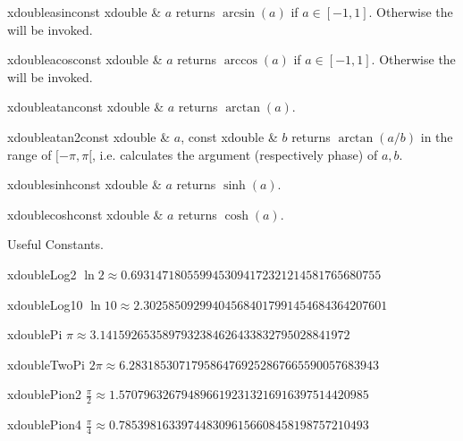 \begin{fcode}{xdouble}{asin}{const xdouble & $a$}
  returns $\arcsin(a)$ if $a \in [ -1, 1 ]$.  Otherwise the \LEH will be invoked.
\end{fcode}

\begin{fcode}{xdouble}{acos}{const xdouble & $a$}
  returns $\arccos(a)$ if $a \in [ -1, 1 ]$.  Otherwise the \LEH will be invoked.
\end{fcode}

\begin{fcode}{xdouble}{atan}{const xdouble & $a$}
  returns $\arctan(a)$.
\end{fcode}

\begin{fcode}{xdouble}{atan2}{const xdouble & $a$, const xdouble & $b$}
  returns $\arctan(a / b)$ in the range of $[ -\pi, \pi [$, i.e. 
  calculates the argument (respectively phase) of $a, b$.
\end{fcode}




\begin{fcode}{xdouble}{sinh}{const xdouble & $a$}
  returns $\sinh(a)$.
\end{fcode}


\begin{fcode}{xdouble}{cosh}{const xdouble & $a$}
  returns $\cosh(a)$.
\end{fcode}




Useful Constants.

\begin{fcode}{xdouble}{Log2}{}
    $\ln 2 \approx 0.6931471805599453094172321214581765680755$
\end{fcode}
\begin{fcode}{xdouble}{Log10}{}
  $\ln 10 \approx 2.302585092994045684017991454684364207601$ 
\end{fcode}
\begin{fcode}{xdouble}{Pi}{}
  $\pi \approx 3.1415926535897932384626433832795028841972$ 
\end{fcode}
\begin{fcode}{xdouble}{TwoPi}{}
  $2 \pi \approx 6.2831853071795864769252867665590057683943$ 
\end{fcode}
\begin{fcode}{xdouble}{Pion2}{}
  $\frac{\pi}{2} \approx 1.5707963267948966192313216916397514420985$ 
\end{fcode}
\begin{fcode}{xdouble}{Pion4}{}
  $\frac{\pi}{4} \approx 0.7853981633974483096156608458198757210493$ 
\end{fcode}


